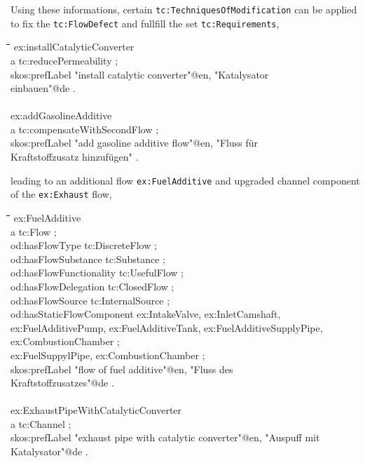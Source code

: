 \documentclass[a4paper,11pt]{article}
\newenvironment{code}{\tt \begin{tabbing}
\hskip12pt\=\hskip12pt\=\hskip12pt\=\hskip12pt\=\hskip5cm\=\hskip5cm\=\kill}
{\end{tabbing}}
\begin{document}
    Using these informations, certain \texttt{tc:TechniquesOfModification} can 
    be applied to fix the \texttt{tc:FlowDefect} and fullfill the set 
    \texttt{tc:Requirements},
    
    \begin{code}
    ex:installCatalyticConverter \\
    \> a tc:reducePermeability ; \\
    \> skos:prefLabel "install catalytic converter"@en, "Katalysator  \\
    \> einbauen"@de .  \\
    \\
    ex:addGasolineAdditive \\
    \> a tc:compensateWithSecondFlow ; \\
    \> skos:prefLabel "add gasoline additive flow"@en, "Fluss für  \\
    \> Kraftstoffzusatz hinzufügen" . \\
    \end{code}
    
    leading to an additional flow \texttt{ex:FuelAdditive} and upgraded channel
    component of the \texttt{ex:Exhaust} flow,
    \begin{code}
    ex:FuelAdditive \\
    \> a tc:Flow ; \\
    \> od:hasFlowType tc:DiscreteFlow ; \\
    \> od:hasFlowSubstance tc:Substance ; \\
    \> od:hasFlowFunctionality tc:UsefulFlow ; \\
    \> od:hasFlowDelegation tc:ClosedFlow ; \\
    \> od:hasFlowSource tc:InternalSource ; \\
    \> od:hasStaticFlowComponent ex:IntakeValve, ex:InletCamshaft, \\
    \> ex:FuelAdditivePump, ex:FuelAdditiveTank, ex:FuelAdditiveSupplyPipe, \\
    \> ex:CombustionChamber ; \\
    \> ex:FuelSuppylPipe, ex:CombustionChamber ; \\
    \> skos:prefLabel "flow of fuel additive"@en, "Fluss des  \\
    \> Kraftstoffzusatzes"@de . \\
    \\
    ex:ExhaustPipeWithCatalyticConverter \\
    \> a tc:Channel ; \\
    \> skos:prefLabel "exhaust pipe with catalytic converter"@en, "Auspuff mit  \\
    \> Katalysator"@de . \\
    \end{code}
    
\end{document}
